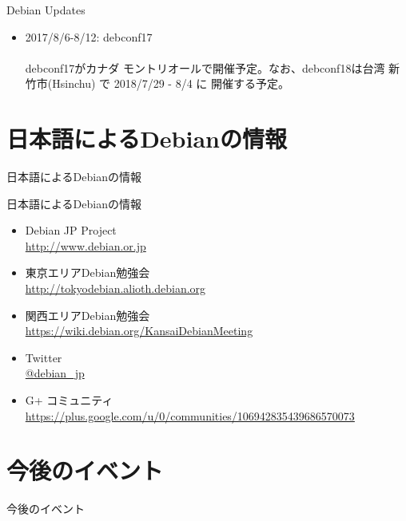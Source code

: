 \begin{frame}{Debian Updates}%

\begin{itemize}[<+->]
\item 2017/8/6-8/12:  debconf17\\
\ \\
  \small{debconf17がカナダ モントリオールで開催予定。なお、debconf18は台湾 新竹市(Hsinchu) で 2018/7/29 - 8/4 に 開催する予定。}

\end{itemize}

\end{frame}


\section{日本語によるDebianの情報}
\begin{frame}\begin{center}\Huge{日本語によるDebianの情報}\end{center}\end{frame}

\begin{frame}{日本語によるDebianの情報}
\begin{itemize}
  \item Debian JP Project \\
      \url{http://www.debian.or.jp}
  \item 東京エリアDebian勉強会\\
      \url{http://tokyodebian.alioth.debian.org}
  \item 関西エリアDebian勉強会 \\
      \url{https://wiki.debian.org/KansaiDebianMeeting}
  \item Twitter \\
      \url{@debian_jp}
  \item G+ コミュニティ \\
      \url{https://plus.google.com/u/0/communities/106942835439686570073}
 
\end{itemize}
\end{frame}


\section{今後のイベント}

\begin{frame}\begin{center}\Huge{今後のイベント}\end{center}\end{frame}

